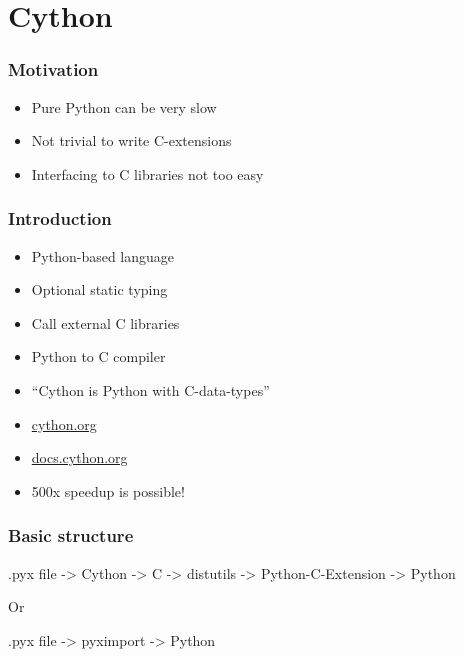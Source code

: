 \documentclass[14pt,compress]{beamer}
\begin{document}
\section{Cython}

\begin{frame}
  \frametitle{Motivation}
  \begin{itemize}

      \item Pure Python can be very slow

      \item Not trivial to write C-extensions

      \item Interfacing to C libraries not too easy 

  \end{itemize}

\end{frame}

\begin{frame}
  \frametitle{Introduction}
  \begin{itemize}
    
    \item Python-based language

    \item Optional static typing

    \item Call external C libraries

    \item Python to C compiler

    \item \alert{``Cython is Python with C-data-types''}

    \item \url{cython.org}

    \item \url{docs.cython.org}
    
    \item 500x speedup is possible!

  \end{itemize}

\end{frame}

\begin{frame}
    \frametitle{Basic structure}

    .pyx file -> Cython -> C -> distutils -> Python-C-Extension ->
    Python

    Or

    .pyx file -> pyximport -> Python

\end{frame}
\end{document}
